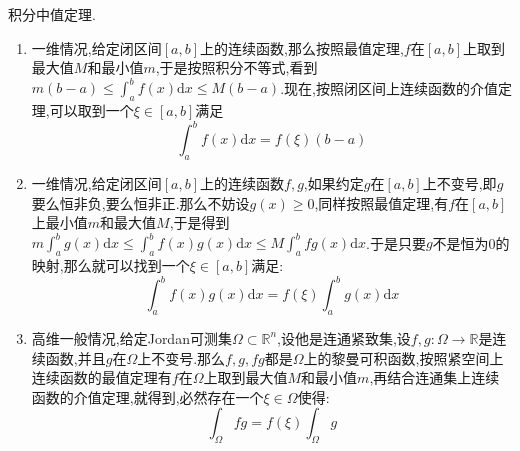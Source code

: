 积分中值定理.
\begin{enumerate}
	\item 一维情况,给定闭区间$[a,b]$上的连续函数,那么按照最值定理,$f$在$[a,b]$上取到最大值$M$和最小值$m$,于是按照积分不等式,看到$m(b-a)\le\int_a^bf(x)\mathrm{d}x\le M(b-a)$.现在,按照闭区间上连续函数的介值定理,可以取到一个$\xi\in[a,b]$满足
	$$\int_a^bf(x)\mathrm{d}x=f(\xi)(b-a)$$
	\item 一维情况,给定闭区间$[a,b]$上的连续函数$f,g$,如果约定$g$在$[a,b]$上不变号,即$g$要么恒非负,要么恒非正.那么不妨设$g(x)\ge0$,同样按照最值定理,有$f$在$[a,b]$上最小值$m$和最大值$M$,于是得到$m\int_a^bg(x)\mathrm{d}x\le\int_a^bf(x)g(x)\mathrm{d}x\le M\int_a^bfg(x)\mathrm{d}x$.于是只要$g$不是恒为0的映射,那么就可以找到一个$\xi\in[a,b]$满足:
	$$\int_a^bf(x)g(x)\mathrm{d}x=f(\xi)\int_a^bg(x)\mathrm{d}x$$
	\item 高维一般情况,给定Jordan可测集$\Omega\subset\mathbb{R}^n$,设他是连通紧致集,设$f,g:\Omega\to\mathbb{R}$是连续函数,并且$g$在$\Omega$上不变号.那么$f,g,fg$都是$\Omega$上的黎曼可积函数,按照紧空间上连续函数的最值定理有$f$在$\Omega$上取到最大值$M$和最小值$m$,再结合连通集上连续函数的介值定理,就得到,必然存在一个$\xi\in\Omega$使得:
	$$\int_{\Omega}fg=f(\xi)\int_{\Omega}g$$
\end{enumerate}

